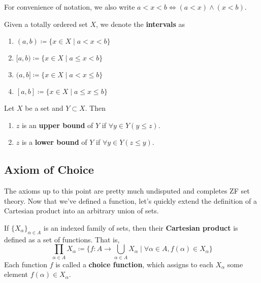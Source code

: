 \documentclass{article}
\begin{document}
    For convenience of notation, we also write $a < x < b \iff (a < x) \land (x < b)$. 

    \begin{definition}[Interval]
      Given a totally ordered set $X$, we denote the \textbf{intervals} as 
      \begin{enumerate}
        \item $(a, b) \coloneqq \{x \in X \mid a < x < b \}$
        \item $[a, b) \coloneqq \{x \in X \mid a \leq x < b \}$
        \item $(a, b] \coloneqq \{x \in X \mid a < x \leq b \}$
        \item $[a, b] \coloneqq \{x \in X \mid a \leq x \leq b \}$
      \end{enumerate}
    \end{definition} 

    \begin{definition}[Bounds]
      Let $X$ be a set and $Y \subset X$. Then 
      \begin{enumerate}
        \item $z$ is an \textbf{upper bound} of $Y$ if $\forall y \in Y (y \leq z)$. 
        \item $z$ is a \textbf{lower bound} of $Y$ if $\forall y \in Y (z \leq y)$. 
      \end{enumerate}
    \end{definition}

  \subsection{Axiom of Choice}

    The axioms up to this point are pretty much undisputed and completes ZF set theory. Now that we've defined a function, let's quickly extend the definition of a Cartesian product into an arbitrary union of sets. 
    
    \begin{definition}
      If $\{X_\alpha\}_{\alpha \in A}$ is an indexed family of sets, then their \textbf{Cartesian product} is defined as a set of functions. That is, 
      \begin{equation}
        \prod_{\alpha \in A} X_\alpha \coloneqq \bigg\{ f: A \rightarrow \bigcup_{\alpha \in A} X_\alpha \;\Big|\; \forall \alpha \in A, f(\alpha) \in X_\alpha \bigg\} 
      \end{equation}
      Each function $f$ is called a \textbf{choice function}, which assigns to each $X_\alpha$ some element $f(\alpha) \in X_\alpha$. 
    \end{definition} 
\end{document}
